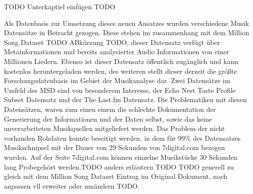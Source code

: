 \documentclass[twosided,a4,10pt]{article}
\begin{document}
\begin{multicols}{2}
		TODO Unterkaptiel einfügen TODO
		
		Als Datenbasis zur Umsetzung dieses neuen Ansatzes wurden verschiedene Musik Datensätze in Betracht gezogen. Diese stehen im zusammenhang mit dem Million Song Dataset TODO ABkürzung TODO, dieser Datensatz verfügt über Metainformationen und bereits analysierter Audio Informationen von einer Millionen Liedern. Ebenso ist dieser Datensatz öffentlich zugänglich und kann kostenlos heruntergeladen werden, des weiteren stellt dieser derzeit die größte Forschungsdatenbasis im Gebiet der Musikanalyse dar. Zwei Datensätze im Umfeld des MSD sind von besonderem Interesse, der Echo Nest Taste Profile Subset Datensatz und der The Last.fm Datensatz. Die Problematiken mit diesen Datensätzen, waren zum einen einem die schlechte Dokumentation der Generierung der Informationen und der Daten selbst, sowie das keine unverarbeiteten Musikquellen mitgeliefert werden. Das Problem der nicht vorhanden Rohdaten konnte beseitigt werden, in dem für 99\% des Datensatzes Musikschnipsel mit der Dauer von 29 Sekunden von 7digital.com bezogen wurden. Auf der Seite 7digital.com können einzelne Musikstücke 30 Sekunden lang Probegehört werden.TODO anders erläutern TODO TODO generell zu gleich mit dem Million Song Dataset Eintrag im Original Dokument, noch anpassen vll erweiter oder umändern TODO. 

\end{multicols}
\end{document}

